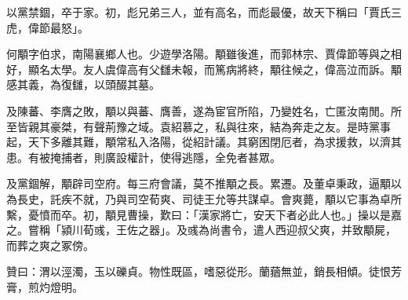 \begin{pinyinscope}
以黨禁錮，卒于家。初，彪兄弟三人，並有高名，而彪最優，故天下稱曰「賈氏三虎，偉節最怒」。

何顒字伯求，南陽襄鄉人也。少遊學洛陽。顒雖後進，而郭林宗、賈偉節等與之相好，顯名太學。友人虞偉高有父讎未報，而篤病將終，顒往候之，偉高泣而訴。顒感其義，為復讎，以頭醊其墓。

及陳蕃、李膺之敗，顒以與蕃、膺善，遂為宦官所陷，乃變姓名，亡匿汝南閒。所至皆親其豪桀，有聲荊豫之域。袁紹慕之，私與往來，結為奔走之友。是時黨事起，天下多離其難，顒常私入洛陽，從紹計議。其窮困閉厄者，為求援救，以濟其患。有被掩捕者，則廣設權計，使得逃隱，全免者甚眾。

及黨錮解，顒辟司空府。每三府會議，莫不推顒之長。累遷。及董卓秉政，逼顒以為長史，託疾不就，乃與司空荀爽、司徒王允等共謀卓。會爽薨，顒以它事為卓所繫，憂憤而卒。初，顒見曹操，歎曰：「漢家將亡，安天下者必此人也。」操以是嘉之。嘗稱「潁川荀彧，王佐之器」。及彧為尚書令，遣人西迎叔父爽，并致顒屍，而葬之爽之冢傍。

贊曰：渭以涇濁，玉以礫貞。物性既區，嗜惡從形。蘭蕕無並，銷長相傾。徒恨芳膏，煎灼燈明。


\end{pinyinscope}